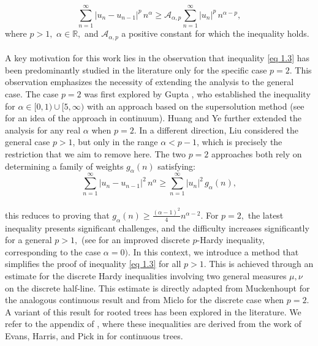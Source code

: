 \documentclass[11pt]{amsart}
\newcommand{\1}{[1]}
\begin{document}
\begin{equation}
\sum_{n=1}^{\infty} |u_{n} - u_{n-1}|^{p} \, n^{\alpha} \geq \mathcal{A}_{\alpha,p} \sum_{n=1}^{\infty} |u_{n}|^{p} \, n^{\alpha - p},
\tag{1.3} \label{eq 1.3}
\end{equation}
where $p > 1,$  $\alpha \in \mathbb{R},$ and $\mathcal{A}_{\alpha,p}$ a positive constant for which the inequality holds. \\ \\
A key motivation for this work lies in the observation that inequality \eqref{eq 1.3} has been predominantly studied in the literature only for the specific case $p = 2$. This observation emphasizes the necessity of extending the analysis to the general case. The case $p = 2$ was first explored by Gupta \cite{Gup22}, who established the inequality for $\alpha \in [0, 1) \cup [5, \infty)$ with an approach based on the supersolution method (see \cite{Caz20} for an idea of the approach in continuum). Huang and Ye \cite{Ye23} further extended the analysis for any real \(\alpha\) when $p=2.$ In a different direction,
Liu \cite{Liu12} considered the general case \(p>1\), but only in the
range \(\alpha<p-1\), which is precisely the restriction that we aim to
remove here. The two \(p=2\) approaches both rely on determining a family of weights $g_{\alpha}(n)$ satisfying:
$$\sum_{n=1}^{\infty} |u_{n} - u_{n-1}|^{2} \, n^{\alpha} \geq \sum_{n=1}^{\infty} |u_{n}|^{2} \, g_{\alpha}(n),$$
\phantom{.} \\
this reduces to proving that
 $\displaystyle g_{\alpha}(n) \geq \frac{(\alpha - 1)^2}{4} n^{\alpha - 2}.$ For $p = 2,$ the latest inequality presents significant challenges, and the difficulty increases significantly for a general $p > 1,$ (see \cite{FKP23} for an improved discrete $p$-Hardy inequality, corresponding to the case $\alpha=0).$ In this context, we introduce a method that simplifies the proof of inequality \eqref{eq 1.3} for all \(p > 1\). This is achieved through an estimate for the discrete Hardy inequalities involving two general measures \(\mu, \nu\) on the discrete half-line. This estimate is directly adapted from Muckenhoupt \cite{Muck72} for the analogous continuous result and from Miclo \cite{Mic99} for the discrete case when \(p = 2\). A variant of this result for rooted trees has been explored in the literature. We refer to the appendix of \cite{Mic98}, where these inequalities are derived from the work of Evans, Harris, and Pick in \cite{Evans95} for continuous trees. \\ \\
\end{document}
